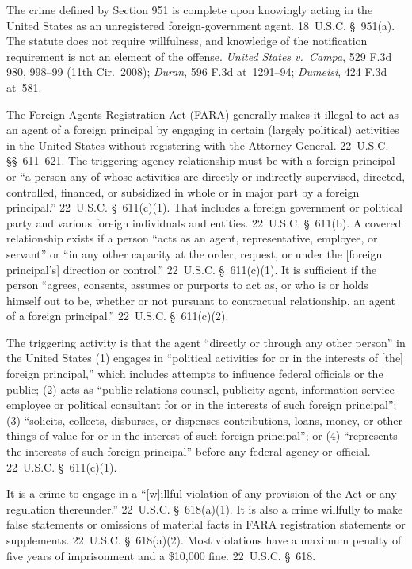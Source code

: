 The crime defined by Section 951 is complete upon knowingly acting in the United States as an unregistered foreign-government agent.
18~U.S.C. \S~951(a).
The statute does not require willfulness, and knowledge of the notification requirement is not an element of the offense.
\textit{United States v.\ Campa}, 529 F.3d 980, 998--99 (11th Cir.~2008); \textit{Duran}, 596 F.3d at~1291--94; \textit{Dumeisi}, 424 F.3d at~581.

The Foreign Agents Registration Act (FARA) generally makes it illegal to act as an agent of a foreign principal by engaging in certain (largely political) activities in the United States without registering with the Attorney General. 22~U.S.C. \S\S~611--621. The triggering agency relationship must be with a foreign principal or ``a person any of whose activities are directly or indirectly supervised, directed, controlled, financed, or subsidized in whole or in major part by a foreign principal.'' 22~U.S.C. \S~611(c)(1).
That includes a foreign government or political party and various foreign individuals and entities.
22~U.S.C. \S~611(b).
A covered relationship exists if a person ``acts as an agent, representative, employee, or servant'' or ``in any other capacity at the order, request, or under the [foreign principal's] direction or control.''
22~U.S.C. \S~611(c)(1).
It is sufficient if the person ``agrees, consents, assumes or purports to act as, or who is or holds himself out to be, whether or not pursuant to contractual relationship, an agent of a foreign principal.''
22~U.S.C. \S~611(c)(2).

The triggering activity is that the agent ``directly or through any other person'' in the United States (1) engages in ``political activities for or in the interests of [the] foreign principal,'' which includes attempts to influence federal officials or the public; (2) acts as ``public relations counsel, publicity agent, information-service employee or political consultant for or in the interests of such foreign principal''; (3) ``solicits, collects, disburses, or dispenses contributions, loans, money, or other things of value for or in the interest of such foreign principal''; or (4) ``represents the interests of such foreign principal'' before any federal agency or official.
22~U.S.C. \S~611(c)(1).

It is a crime to engage in a ``[w]illful violation of any provision of the Act or any regulation thereunder.''
22~U.S.C. \S~618(a)(1).
It is also a crime willfully to make false statements or omissions of material facts in FARA registration statements or supplements.
22~U.S.C. \S~618(a)(2).
Most violations have a maximum penalty of five years of imprisonment and a \$10,000 fine.
22~U.S.C. \S~618.


